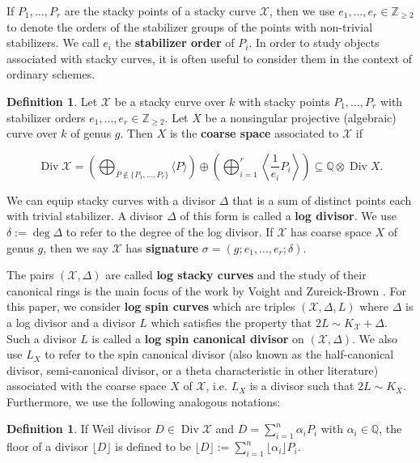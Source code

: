 \documentclass{amsart}
\theoremstyle{plain}
\theoremstyle{definition}
\newtheorem{defn}[thm]{Definition}
\theoremstyle{remark}
\numberwithin{equation}{section}
\newcommand\BQ{{\mathbb Q}}
\newcommand\BZ{{\mathbb Z}}
\newcommand \sx{\mathscr X}
\DeclareMathOperator\di{Div}
\newcommand{\halfcan}{L}
\begin{document}
If $P_1, \ldots, P_r$ are the stacky points of a stacky curve $\sx$,
then we use $e_1, \ldots, e_r \in \BZ_{\geq 2}$ to denote the orders
of the stabilizer groups of the points with non-trivial
stabilizers. We call $e_i$ the \textbf{stabilizer order} of $P_i$.
In order to study objects associated with stacky curves, it is often
useful to consider them in the context of ordinary schemes. 

\begin{defn}
\label{defn:coarse-space}
Let $\sx$ be a stacky curve over $k$ with stacky points $P_1, \ldots,
P_r$ with stabilizer orders $e_1,\ldots, e_r \in \BZ_{\geq 2}$.
Let $X$ be a nonsingular projective (algebraic) curve over $k$ of
genus $g$. Then $X$ is the \textbf{coarse space} associated to $\sx$
if

\[
	\di \sx = \left(\bigoplus_{P\notin \{P_1,\ldots, P_r\}} \langle 
	P \rangle \right) \oplus \left(\bigoplus_{i = 1}^r \left \langle 
	\frac{1}{e_i}P_i \right \rangle \right) \subseteq \BQ \otimes \di X.
\]
\end{defn}

We can equip stacky curves with a divisor $\Delta$ that is a 
sum of distinct points each with trivial stabilizer. A divisor
$\Delta$ of this form is called a \textbf{log divisor}. We use
$\delta := \deg \Delta$ to refer to the degree of the log divisor.
If $\sx$ has coarse space $X$ of genus $g$, then we say $\sx$ has
\textbf{signature} $\sigma = (g; e_1, \ldots, e_r; \delta)$.

The pairs $(\sx, \Delta)$ are called \textbf{log stacky curves}
and the study of their canonical rings is the main focus of
the work by Voight and Zureick-Brown \cite{vzb:stacky}.
For this paper, we consider \textbf{log spin curves} which are
triples $(\sx, \Delta, \halfcan)$ where $\Delta$ is a log divisor
and a divisor $\halfcan$ which satisfies the property that
$2\halfcan \sim K_\sx + \Delta$. Such a divisor $\halfcan$
is called a \textbf{log spin canonical divisor} on $(\sx, \Delta)$. 
We also use $\halfcan_X$ to refer to the spin canonical divisor
(also known as the half-canonical divisor, semi-canonical divisor, 
or a theta characteristic in other literature) associated with the
coarse space $X$ of $  \sx$, i.e. $\halfcan_X$ is a divisor such
that $2\halfcan \sim K_X$. Furthermore, we use the following
analogous notations:

\begin{defn}
\label{defn:divisor-floor}
If Weil divisor $D \in \di \sx$ and $D = \sum_{i = 1}^{n} \alpha_i P_i$
with $\alpha_i \in \BQ$, the floor of a divisor $\lfloor D
\rfloor$ is defined to be $\lfloor D \rfloor := \sum_{i = 1}^{n}
\lfloor \alpha_i \rfloor P_i$.
\end{defn}
\end{document}

